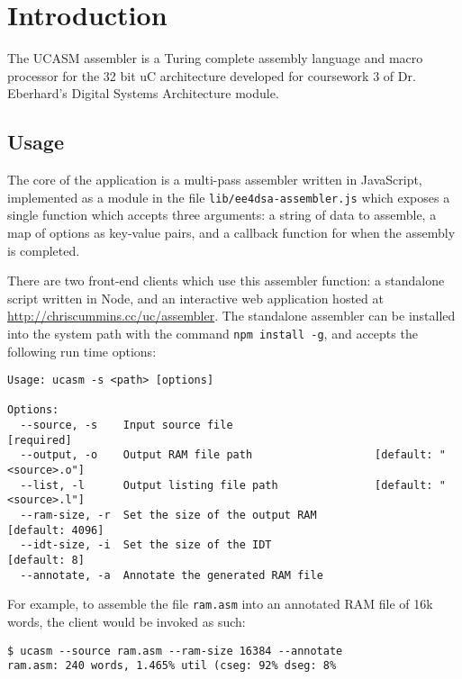 \documentclass[12pt,twoside]{report}
\begin{document}



\tableofcontents

\newpage


\chapter{Introduction}

The UCASM assembler is a Turing complete assembly language and macro
processor for the 32 bit uC architecture developed for coursework 3 of
Dr. Eberhard's Digital Systems Architecture module.

\section{Usage}

The core of the application is a multi-pass assembler written in
JavaScript, implemented as a module in the file
\texttt{lib/ee4dsa-assembler.js} which exposes a single function which
accepts three arguments: a string of data to assemble, a map of
options as key-value pairs, and a callback function for when the
assembly is completed.

There are two front-end clients which use this assembler function: a
standalone script written in Node, and an interactive web application
hosted at \url{http://chriscummins.cc/uc/assembler}. The standalone
assembler can be installed into the system path with the command
\texttt{npm install -g}, and accepts the following run time options:

\begin{verbatim}
Usage: ucasm -s <path> [options]

Options:
  --source, -s    Input source file                                   [required]
  --output, -o    Output RAM file path                   [default: "<source>.o"]
  --list, -l      Output listing file path               [default: "<source>.l"]
  --ram-size, -r  Set the size of the output RAM                 [default: 4096]
  --idt-size, -i  Set the size of the IDT                           [default: 8]
  --annotate, -a  Annotate the generated RAM file
\end{verbatim}

For example, to assemble the file \texttt{ram.asm} into an annotated
RAM file of 16k words, the client would be invoked as such:

\begin{verbatim}
$ ucasm --source ram.asm --ram-size 16384 --annotate
ram.asm: 240 words, 1.465% util (cseg: 92% dseg: 8%
\end{verbatim}
\end{document}
